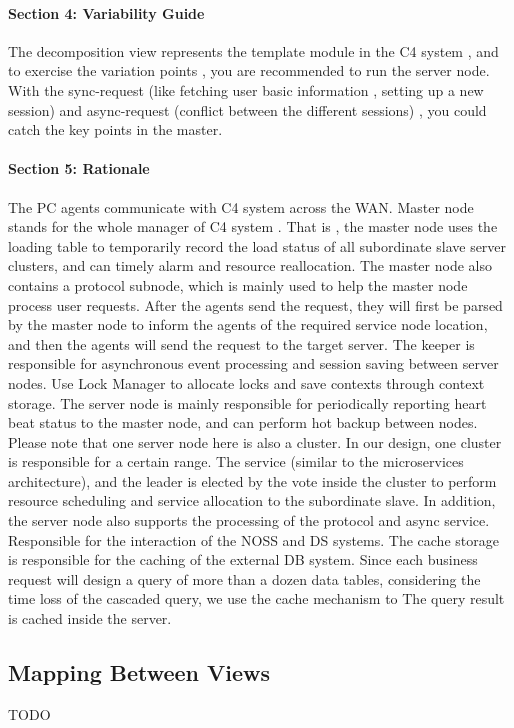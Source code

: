 \documentclass{article}
\begin{document}
			\paragraph{Section 4: Variability Guide}
			The decomposition view represents the template module in the C4 system , and to exercise the variation points , you are recommended to run the server node. With the sync-request (like fetching user basic information , setting up a new session)  and async-request (conflict between the different sessions) , you could catch the key points in the master.
			\paragraph{Section 5: Rationale}
			The PC agents communicate with C4 system across the WAN. 
			Master node stands for the whole manager of C4 system . That is ,  the master node uses the loading table to temporarily record the load status of all subordinate slave server clusters, and can timely alarm and resource reallocation. The master node also contains a protocol subnode, which is mainly used to help the master node process user requests. After the agents send the request, they will first be parsed by the master node to inform the agents of the required service node location, and then the agents will send the request to the target server.	
			The keeper is responsible for asynchronous event processing and session saving between server nodes. Use Lock Manager to allocate locks and save contexts through context storage.
			The server node is mainly responsible for periodically reporting heart beat status to the master node, and can perform hot backup between nodes. Please note that one server node here is also a cluster. In our design, one cluster is responsible for a certain range. The service (similar to the microservices architecture), and the leader is elected by the vote inside the cluster to perform resource scheduling and service allocation to the subordinate slave. In addition, the server node also supports the processing of the protocol and async service. Responsible for the interaction of the NOSS and DS systems. The cache storage is responsible for the caching of the external DB system. Since each business request will design a query of more than a dozen data tables, considering the time loss of the cascaded query, we use the cache mechanism to The query result is cached inside the server.
			
	\subsection{Mapping Between Views}
	TODO
\end{document}
